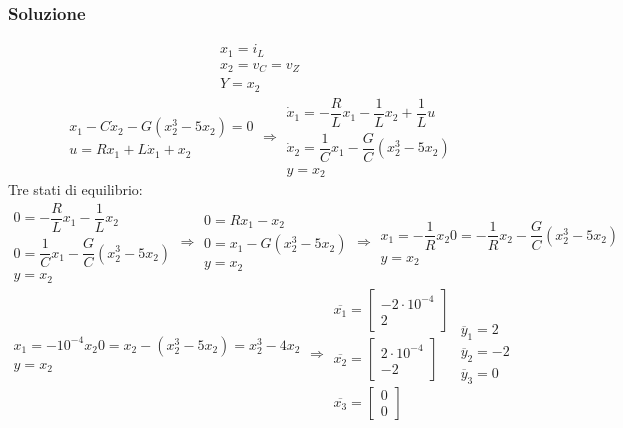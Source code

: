 \documentclass[a4paper]{report}
\begin{document}
\subsubsection{Soluzione}
\[
  \begin{array}{l}
    x_1 = i_L\\
    x_2 = v_C = v_Z\\
    Y = x_2
  \end{array}
\]
\[
  \begin{array}{l}
    x_1 - C\dot{x}_2 - G(x_2^3 - 5 x_2) = 0\\
    u = R x_1 + L \dot{x}_1 + x_2
  \end{array}
  \Rightarrow
  \begin{array}{l}
    \dot{x}_1 = - \dfrac{R}{L}x_1 - \dfrac{1}{L}x_2 + \dfrac{1}{L}u\\
    \dot{x}_2 = \dfrac{1}{C}x_1 - \dfrac{G}{C}(x^3_2 - 5x_2)\\
    y = x_2
  \end{array}
\]
Tre stati di equilibrio:
\[
  \begin{array}{l}
    0 = - \dfrac{R}{L}x_1 - \dfrac{1}{L}x_2\\
    0 = \dfrac{1}{C}x_1 - \dfrac{G}{C}(x^3_2 - 5x_2)\\
    y = x_2
  \end{array}
  \Rightarrow
  \begin{array}{l}
    0 = Rx_1 - x_2\\
    0 = x_1 - G(x^3_2 - 5x_2)\\
    y = x_2
  \end{array}
  \Rightarrow
  \begin{array}{l}
    x_1 = - \dfrac{1}{R}x_2
    0 = - \dfrac{1}{R}x_2 - \dfrac{G}{C}(x^3_2 - 5x_2)\\
    y = x_2
  \end{array}
\]
\[
  \begin{array}{l}
    x_1 = - 10^{-4} x_2
    0 = x_2 - (x^3_2 - 5x_2) = x^3_2 - 4x_2\\
    y = x_2
  \end{array}
  \Rightarrow
  \begin{array}{l}
    \overline{x_1} = 
        \begin{bmatrix}
          -2 \cdot 10^{-4}\\ 2
        \end{bmatrix}\\
    \overline{x_2} =
        \begin{bmatrix}
          2 \cdot 10^{-4}\\ -2
        \end{bmatrix}\\
    \overline{x_3} =
    \begin{bmatrix}
      0\\
      0
    \end{bmatrix}
  \end{array}
  \begin{array}{l}
  \overline{y}_1 = 2\\
  \overline{y}_2 = -2\\
  \overline{y}_3 = 0
  \end{array}
\]
\end{document}
